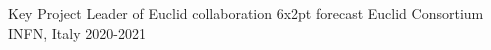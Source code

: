


\begin{cvhonors}


\cvhonor
{Key Project Leader of Euclid collaboration 6x2pt forecast} %
{Euclid Consortium} %
{INFN, Italy} %
{2020-2021} %


\end{cvhonors}
